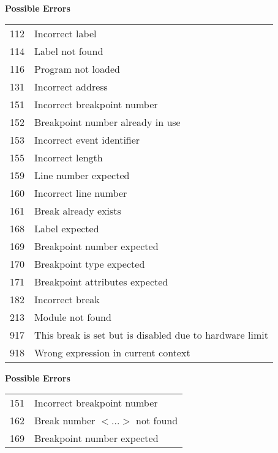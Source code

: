 {\samepage
{\bf Possible Errors}
\begin{flushleft}
\begin{tabular}{ll}
112 & Incorrect label \\
114 & Label not found \\
116 & Program not loaded \\
131 & Incorrect address \\
151 & Incorrect breakpoint number \\
152 & Breakpoint number already in use \\
153 & Incorrect event identifier \\
155 & Incorrect length \\
159 & Line number expected \\
160 & Incorrect line number \\
161 & Break already exists \\
168 & Label expected \\
169 & Breakpoint number expected \\
170 & Breakpoint type expected \\
171 & Breakpoint attributes expected \\
182 & Incorrect break \\
213 & Module not found \\
917 & This break is set but is disabled due to hardware limit\\
918 & Wrong expression in current context
\end{tabular}
\end{flushleft}
} %
{} %


{\samepage
{\bf Possible Errors}
\begin{flushleft}
\begin{tabular}{ll}
151 & Incorrect breakpoint number \\
162 & Break number $<$...$>$ not found \\
169 & Breakpoint number expected
\end{tabular}
\end{flushleft}
} %
{} %

